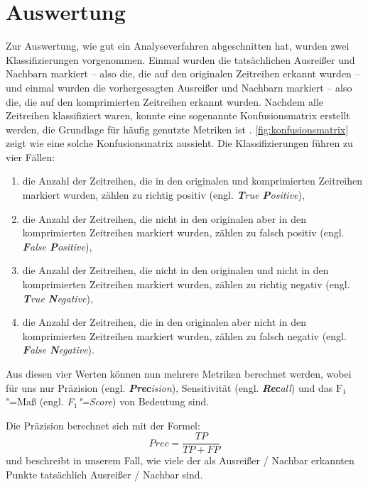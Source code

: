 \section{Auswertung}\label{sec:auswertung}
\newcommand{\tikztextc}[3]{\node at (#1, #2) {\vphantom{/}\smash{#3}};}
\newcommand{\tikztextupc}[3]{\node at (#1, #2) [rotate = 90] {\vphantom{/}\smash{#3}};}
Zur Auswertung, wie gut ein Analyseverfahren abgeschnitten hat, wurden zwei Klassifizierungen vorgenommen. Einmal wurden die tatsächlichen Ausreißer und Nachbarn markiert -- also die, die auf den originalen Zeitreihen erkannt wurden -- und einmal wurden die vorhergesagten Ausreißer und Nachbarn markiert -- also die, die auf den komprimierten Zeitreihen erkannt wurden. Nachdem alle Zeitreihen klassifiziert waren, konnte eine sogenannte Konfusionsmatrix erstellt werden, die Grundlage für häufig genutzte Metriken ist \cite{konfusionsmatrix}. \autoref{fig:konfusionsmatrix} zeigt wie eine solche Konfusionsmatrix aussieht. Die Klassifizierungen führen zu vier Fällen: \begin{enumerate}
    \item die Anzahl der Zeitreihen, die in den originalen und komprimierten Zeitreihen markiert wurden, zählen zu richtig positiv (engl. \textit{\textbf{T}rue \textbf{P}ositive}),
    \item die Anzahl der Zeitreihen, die nicht in den originalen aber in den komprimierten Zeitreihen markiert wurden, zählen zu falsch positiv (engl. \textit{\textbf{F}alse \textbf{P}ositive}),
    \item die Anzahl der Zeitreihen, die nicht in den originalen und nicht in den komprimierten Zeitreihen markiert wurden, zählen zu richtig negativ (engl. \textit{\textbf{T}rue \textbf{N}egative}),
    \item die Anzahl der Zeitreihen, die in den originalen aber nicht in den komprimierten Zeitreihen markiert wurden, zählen zu falsch negativ (engl. \textit{\textbf{F}alse \textbf{N}egative}).
\end{enumerate} 

Aus diesen vier Werten können nun mehrere Metriken berechnet werden, wobei für uns nur Präzision (engl. \textit{\textbf{Prec}ision}), Sensitivität (engl. \textit{\textbf{Rec}all}) und das $\text{F}_1$"=Maß (engl. \textit{F$_1$"=Score}) von Bedeutung sind.

Die Präzision berechnet sich mit der Formel: \[Prec = \frac{TP}{TP + FP}\]
und beschreibt in unserem Fall, wie viele der als Ausreißer / Nachbar erkannten Punkte tatsächlich Ausreißer / Nachbar sind.

